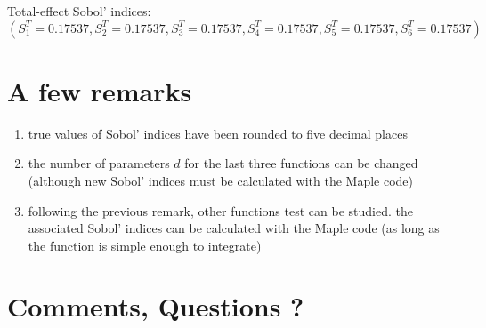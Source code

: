 \documentclass[10pt,a4paper]{article}
\begin{document}
\bigskip

Total-effect Sobol' indices: $$(S_1^T=0.17537,S_2^T=0.17537, S_3^T=0.17537, S_4^T=0.17537, S_5^T=0.17537, S_6^T=0.17537)$$

\bigskip

\section*{A few remarks}

\begin{enumerate}[.]
\item true values of Sobol' indices have been rounded to five decimal places
\item the number of parameters $d$ for the last three functions can be changed (although new Sobol' indices must be calculated with the Maple code)
\item following the previous remark, other functions test can be studied. the associated Sobol' indices can be calculated with the Maple code (as long as the function is simple enough to integrate)
\end{enumerate}

\bigskip

\section*{Comments, Questions ?}
\end{document}

